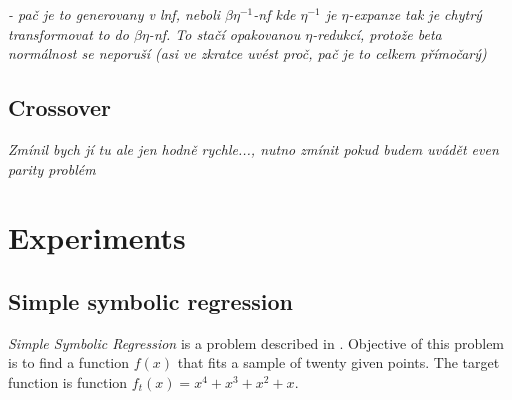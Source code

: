 \documentclass{llncs}
\newcommand{\beenf}{$\beta\eta^{-1}$-\textit{nf}\xspace}
\newcommand{\benf}{$\beta\eta$-\textit{nf}\xspace}
\begin{document}
\textit{- pač je to generovany v lnf, neboli \beenf kde 
$\eta^{-1}$ je $\eta$-expanze tak je chytrý transformovat 
to do \benf. To stačí opakovanou $\eta$-redukcí, protože beta normálnost
se neporuší (asi ve zkratce uvést proč, pač je to celkem přímočarý) 
}

\subsection{Crossover}

\textit{Zmínil bych jí tu ale jen hodně rychle..., nutno zmínit
pokud budem uvádět even parity problém }

\section{Experiments}
\label{experiments}

\subsection{Simple symbolic regression}

\textit{Simple Symbolic Regression} is a problem described
in \cite{koza92}. Objective of this problem is to 
find a function $f(x)$ that fits a sample
of twenty given points. The target function is 
function $f_{t}(x) = x^4 + x^3 + x^2 + x$.  
\end{document}
